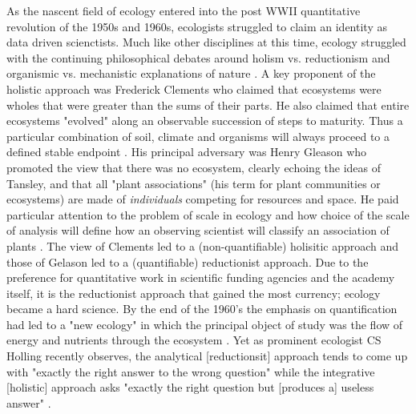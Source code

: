 As the nascent field of ecology entered into the post WWII quantitative revolution of the 1950s and 1960s, ecologists struggled to claim an identity as data driven scienctists. Much like other disciplines at this time, ecology struggled with the continuing philosophical debates around holism vs. reductionism and organismic vs. mechanistic explanations of nature \cite{barbour_1996}. A key proponent of the holistic approach was Frederick Clements who claimed that ecosystems were wholes that were greater than the sums of their parts. He also claimed that entire ecosystems "evolved" along an observable succession of steps to maturity. Thus a particular combination of soil, climate and organisms will always proceed to a defined stable endpoint \cite{clements_1936}. His principal adversary was Henry Gleason who promoted the view that there was no ecosystem, clearly echoing the ideas of Tansley, and that all "plant associations" (his term for plant communities or ecosystems) are made of \textit{individuals} competing for resources and space. He paid particular attention to the problem of scale in ecology and how choice of the scale of analysis will define how an observing scientist will classify an association of plants \cite{gleason_1939}. The view of Clements led to a (non-quantifiable) holisitic approach and those of Gelason led to a (quantifiable) reductionist approach. Due to the preference for quantitative work in scientific funding agencies and the academy itself, it is the reductionist approach that gained the most currency; ecology became a hard science. By the end of the 1960's the emphasis on quantification had led to a "new ecology" in which the principal object of study was the flow of energy and nutrients through the ecosystem \cite{worster_1977}.  Yet as prominent ecologist CS Holling recently observes, the analytical [reductionsit] approach tends to come up with "exactly the right answer to the wrong question" while the integrative [holistic] approach asks "exactly the right question but [produces a] useless answer" \cite[][p. 3]{holling_1998}.

